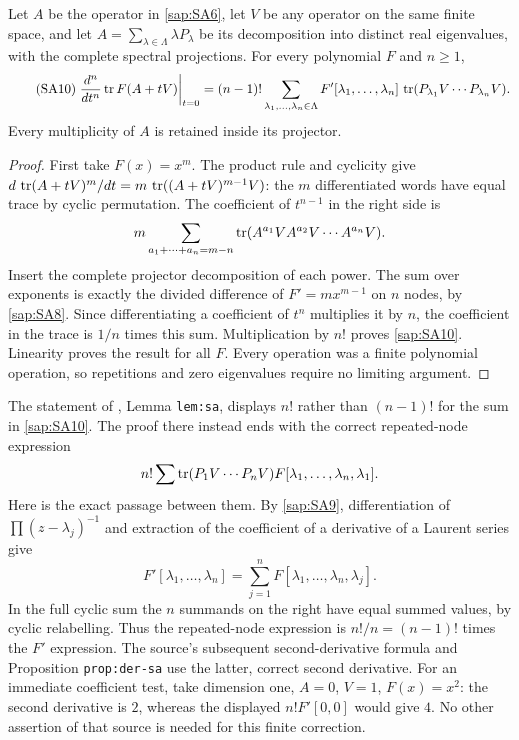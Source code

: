 \begin{saptheorem}\label{sap:thm:cyclic}
Let $A$ be the operator in \eqref{sap:SA6}, let $V$ be any
operator on the same finite space, and let
$A=\sum_{\lambda\in\Lambda}\lambda P_\lambda$ be its
decomposition into distinct real eigenvalues, with the
complete spectral projections. For every polynomial $F$
and $n\geq1$,
\begin{equation}\tag{SA10}\label{sap:SA10}
\left.\frac{d^n}{dt^n}\operatorname{tr} F(A+tV)\right|_{t=0}
=(n-1)!\sum_{\lambda_1,\ldots,\lambda_n\in\Lambda}
F'[\lambda_1,\ldots,\lambda_n]\,
\operatorname{tr}(P_{\lambda_1}V\cdots P_{\lambda_n}V).
\end{equation}
Every multiplicity of $A$ is retained inside its projector.
\end{saptheorem}
\begin{proof}
First take $F(x)=x^m$. The product rule and cyclicity give
$d\,\operatorname{tr}(A+tV)^m/dt=m\,\operatorname{tr}((A+tV)^{m-1}V)$:
the $m$ differentiated words have equal trace by cyclic
permutation. The coefficient of $t^{n-1}$ in the right
side is
\[
m\sum_{a_1+\cdots+a_n=m-n}
\operatorname{tr}(A^{a_1}V A^{a_2}V\cdots A^{a_n}V).
\]
Insert the complete projector decomposition of each power.
The sum over exponents is exactly the divided difference
of $F'=mx^{m-1}$ on $n$ nodes, by \eqref{sap:SA8}.
Since differentiating a coefficient of $t^n$ multiplies
it by $n$, the coefficient in the trace is $1/n$ times
this sum. Multiplication by $n!$ proves \eqref{sap:SA10}.
Linearity proves the result for all $F$. Every operation
was a finite polynomial operation, so repetitions and
zero eigenvalues require no limiting argument.
\end{proof}

The statement of \cite{sap:CV}, Lemma \texttt{lem:sa}, displays
$n!$ rather than $(n-1)!$ for the sum in \eqref{sap:SA10}.
The proof there instead ends with the correct repeated-node
expression
\[
n!\sum\operatorname{tr}(P_1V\cdots P_nV)F[\lambda_1,\ldots,\lambda_n,\lambda_1].
\]
Here is the exact passage between them. By \eqref{sap:SA9},
differentiation of $\prod(z-\lambda_j)^{-1}$ and extraction
of the coefficient of a derivative of a Laurent series give
\begin{equation}\tag{SA11}\label{sap:SA11}
F'[\lambda_1,\ldots,\lambda_n]
=\sum_{j=1}^n
F[\lambda_1,\ldots,\lambda_n,\lambda_j].
\end{equation}
In the full cyclic sum the $n$ summands on the right
have equal summed values, by cyclic relabelling.
Thus the repeated-node expression is $n!/n=(n-1)!$
times the $F'$ expression. The source's subsequent
second-derivative formula and Proposition
\texttt{prop:der-sa} use the latter, correct second
derivative. For an immediate coefficient test, take
dimension one, $A=0$, $V=1$, $F(x)=x^2$: the second
derivative is $2$, whereas the displayed $n!F'[0,0]$
would give $4$. No other assertion of that source is
needed for this finite correction.

